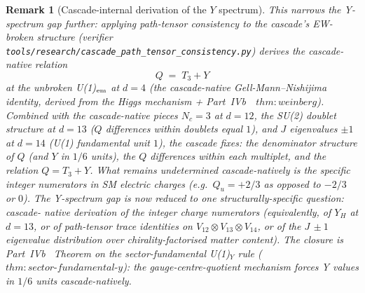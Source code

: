 \documentclass[12pt,a4paper]{article}
\newtheorem{remark}[theorem]{Remark}
\begin{document}
\begin{remark}[Cascade-internal derivation of the $Y$ spectrum]
This narrows the Y-spectrum gap further: applying path-tensor
consistency to the cascade's EW-broken structure
(verifier
\texttt{tools/research/cascade\_path\_tensor\_consistency.py})
\emph{derives} the cascade-native relation
\[
Q \;=\; T_3 + Y
\]
at the unbroken U(1)$_{\rm em}$ at $d=4$ (the cascade-native
Gell-Mann--Nishijima identity, derived from the Higgs mechanism +
Part~IVb~\cite{part4b}~$\mathit{thm{:}weinberg}$). Combined with
the cascade-native pieces $N_c = 3$ at $d=12$, the SU(2) doublet
structure at $d=13$ ($Q$ differences within doublets equal $1$),
and $J$ eigenvalues $\pm 1$ at $d=14$ (U(1) fundamental unit $1$),
the cascade fixes: the denominator structure of $Q$ (and $Y$ in
$1/6$ units), the $Q$ differences within each multiplet, and the
relation $Q = T_3 + Y$. What remains undetermined cascade-natively
is the \emph{specific integer numerators} in SM electric charges
(e.g.\ $Q_u = +2/3$ as opposed to $-2/3$ or $0$). The Y-spectrum
gap is now reduced to one structurally-specific question: cascade-
native derivation of the integer charge numerators (equivalently,
of $Y_H$ at $d=13$, or of path-tensor trace identities on
$V_{12}\otimes V_{13}\otimes V_{14}$, or of the $J\,\pm 1$ eigenvalue
distribution over chirality-factorised matter content). The closure is
Part~IVb~\cite{part4b} Theorem on the sector-fundamental U(1)$_Y$ rule
($\mathit{thm{:}sector\text{-}fundamental\text{-}y}$): the gauge-centre-quotient
mechanism forces Y values in $1/6$ units cascade-natively.


\end{remark}
\end{document}

